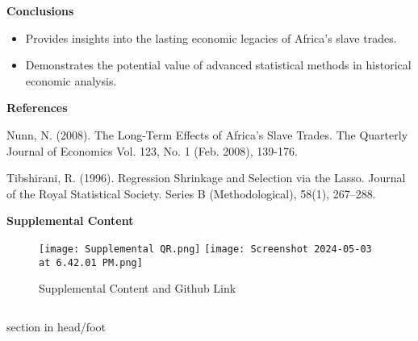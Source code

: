 \documentclass[final]{beamer}
\begin{document}
\begin{frame}[t]
\begin{columns}[T]
\begin{column}{.32\textwidth}
    \vspace{0.1cm} %

    \begin{block}{\Large \textbf{Conclusions}} %
    \Large %
    \begin{itemize}
\item Provides insights into the lasting economic legacies of Africa's slave trades.
  \item Demonstrates the potential value of advanced statistical methods in historical economic analysis.
  \end{itemize}
    \end{block}

    \vspace{0.1cm} %

    \begin{block}{\Large \textbf{References}} %
    \small
    \item Nunn, N. (2008). The Long-Term Effects of Africa’s Slave Trades. The Quarterly Journal of 	Economics Vol. 123, No. 1 (Feb. 2008), 139-176.  
     \item Tibshirani, R. (1996). Regression Shrinkage and Selection via the Lasso. Journal of the Royal 	Statistical Society. Series B (Methodological), 58(1), 267–288.  
    \end{block}

    \vspace{0.1cm} %

    \begin{block}{\Large \textbf{Supplemental Content}} %
    \Large %
     \begin{center}
\begin{figure}
        \centering
        \texttt{[image: Supplemental QR.png]}
        \hfill %
        \texttt{[image: Screenshot 2024-05-03 at 6.42.01 PM.png]}
        \caption{Supplemental Content and Github Link} 
    \end{figure}
        \end{center}
    
    \end{block}

\end{column}

\end{columns}
    \vspace{0.3cm} %
\begin{beamercolorbox}[center]{section in head/foot}
    \Large 
\end{beamercolorbox}

\end{frame}
\end{document}
